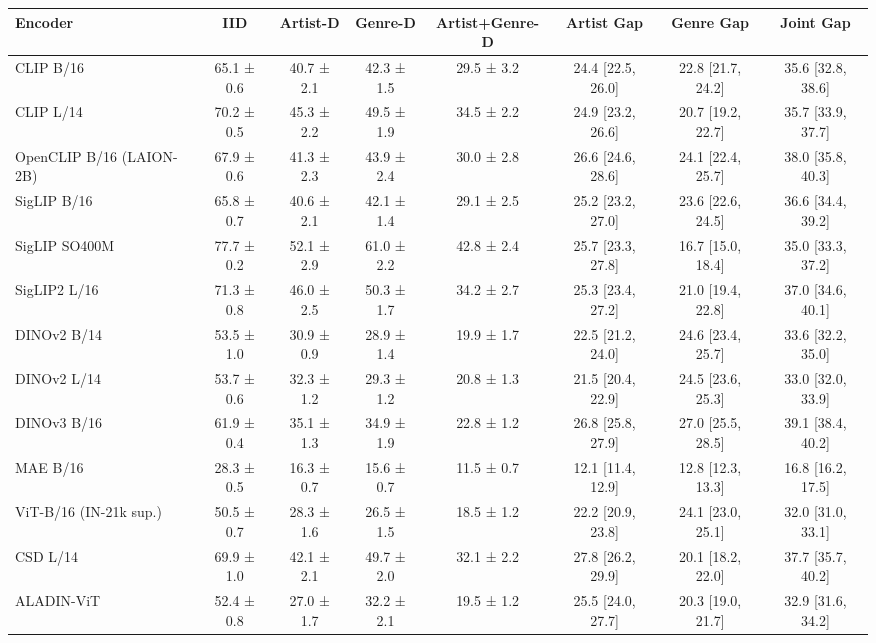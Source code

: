 \begin{tabular}{lccccccc}
\toprule
Encoder & IID & Artist-D & Genre-D & Artist+Genre-D & Artist Gap & Genre Gap & Joint Gap \\
\midrule
CLIP B/16 & 65.1 ± 0.6 & 40.7 ± 2.1 & 42.3 ± 1.5 & 29.5 ± 3.2 & 24.4 [22.5, 26.0] & 22.8 [21.7, 24.2] & 35.6 [32.8, 38.6] \\
CLIP L/14 & 70.2 ± 0.5 & 45.3 ± 2.2 & 49.5 ± 1.9 & 34.5 ± 2.2 & 24.9 [23.2, 26.6] & 20.7 [19.2, 22.7] & 35.7 [33.9, 37.7] \\
OpenCLIP B/16 (LAION-2B) & 67.9 ± 0.6 & 41.3 ± 2.3 & 43.9 ± 2.4 & 30.0 ± 2.8 & 26.6 [24.6, 28.6] & 24.1 [22.4, 25.7] & 38.0 [35.8, 40.3] \\
SigLIP B/16 & 65.8 ± 0.7 & 40.6 ± 2.1 & 42.1 ± 1.4 & 29.1 ± 2.5 & 25.2 [23.2, 27.0] & 23.6 [22.6, 24.5] & 36.6 [34.4, 39.2] \\
SigLIP SO400M & 77.7 ± 0.2 & 52.1 ± 2.9 & 61.0 ± 2.2 & 42.8 ± 2.4 & 25.7 [23.3, 27.8] & 16.7 [15.0, 18.4] & 35.0 [33.3, 37.2] \\
SigLIP2 L/16 & 71.3 ± 0.8 & 46.0 ± 2.5 & 50.3 ± 1.7 & 34.2 ± 2.7 & 25.3 [23.4, 27.2] & 21.0 [19.4, 22.8] & 37.0 [34.6, 40.1] \\
DINOv2 B/14 & 53.5 ± 1.0 & 30.9 ± 0.9 & 28.9 ± 1.4 & 19.9 ± 1.7 & 22.5 [21.2, 24.0] & 24.6 [23.4, 25.7] & 33.6 [32.2, 35.0] \\
DINOv2 L/14 & 53.7 ± 0.6 & 32.3 ± 1.2 & 29.3 ± 1.2 & 20.8 ± 1.3 & 21.5 [20.4, 22.9] & 24.5 [23.6, 25.3] & 33.0 [32.0, 33.9] \\
DINOv3 B/16 & 61.9 ± 0.4 & 35.1 ± 1.3 & 34.9 ± 1.9 & 22.8 ± 1.2 & 26.8 [25.8, 27.9] & 27.0 [25.5, 28.5] & 39.1 [38.4, 40.2] \\
MAE B/16 & 28.3 ± 0.5 & 16.3 ± 0.7 & 15.6 ± 0.7 & 11.5 ± 0.7 & 12.1 [11.4, 12.9] & 12.8 [12.3, 13.3] & 16.8 [16.2, 17.5] \\
ViT-B/16 (IN-21k sup.) & 50.5 ± 0.7 & 28.3 ± 1.6 & 26.5 ± 1.5 & 18.5 ± 1.2 & 22.2 [20.9, 23.8] & 24.1 [23.0, 25.1] & 32.0 [31.0, 33.1] \\
CSD L/14 & 69.9 ± 1.0 & 42.1 ± 2.1 & 49.7 ± 2.0 & 32.1 ± 2.2 & 27.8 [26.2, 29.9] & 20.1 [18.2, 22.0] & 37.7 [35.7, 40.2] \\
ALADIN-ViT & 52.4 ± 0.8 & 27.0 ± 1.7 & 32.2 ± 2.1 & 19.5 ± 1.2 & 25.5 [24.0, 27.7] & 20.3 [19.0, 21.7] & 32.9 [31.6, 34.2] \\
\bottomrule
\end{tabular}
